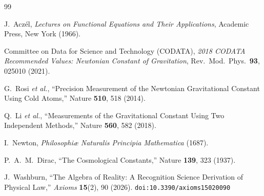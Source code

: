 \documentclass[12pt,a4paper]{article}
\theoremstyle{definition}
\theoremstyle{remark}
\begin{document}
\begin{thebibliography}{99}

J.~Acz\'el, \emph{Lectures on Functional Equations and Their Applications},
Academic Press, New York (1966).

Committee on Data for Science and Technology (CODATA),
\emph{2018 CODATA Recommended Values: Newtonian Constant of
Gravitation}, Rev.\ Mod.\ Phys.\ \textbf{93}, 025010 (2021).

G.~Rosi \emph{et al.}, ``Precision Measurement of the Newtonian
Gravitational Constant Using Cold Atoms,'' Nature \textbf{510},
518 (2014).

Q.~Li \emph{et al.}, ``Measurements of the Gravitational Constant
Using Two Independent Methods,'' Nature \textbf{560}, 582 (2018).

I.~Newton, \emph{Philosophi{\ae} Naturalis Principia Mathematica}
(1687).

P.~A.~M.~Dirac, ``The Cosmological Constants,'' Nature
\textbf{139}, 323 (1937).

J.~Washburn, ``The Algebra of Reality: A Recognition Science Derivation
of Physical Law,'' \emph{Axioms} \textbf{15}(2), 90 (2026).
\texttt{doi:10.3390/axioms15020090}

\end{thebibliography}
\end{document}
